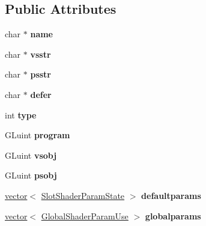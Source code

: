\subsection*{Public Attributes}
\begin{DoxyCompactItemize}
\item 
\mbox{\label{struct_shader_a63fc645b9235c69c54c1a5b6a019db69}} 
char $\ast$ {\bfseries name}
\item 
\mbox{\label{struct_shader_a8f583686f63b84538a737beba119cd3f}} 
char $\ast$ {\bfseries vsstr}
\item 
\mbox{\label{struct_shader_a3e5a80ad5f85e89ac4c89422ce9e760a}} 
char $\ast$ {\bfseries psstr}
\item 
\mbox{\label{struct_shader_aa9a61ea24ee4acdeb925b68b344c45d6}} 
char $\ast$ {\bfseries defer}
\item 
\mbox{\label{struct_shader_a24cd869ce48a60b5a3d3858f50b3f059}} 
int {\bfseries type}
\item 
\mbox{\label{struct_shader_af036f983d35fe0f8f31dedc009b3645e}} 
G\+Luint {\bfseries program}
\item 
\mbox{\label{struct_shader_a568390c78ee4b602db6628ddac38b637}} 
G\+Luint {\bfseries vsobj}
\item 
\mbox{\label{struct_shader_a5e44b9f57fec0dd35ad8ab08b0248491}} 
G\+Luint {\bfseries psobj}
\item 
\mbox{\label{struct_shader_a82b43cd598322ec53103dd4ec26a6782}} 
\hyperlink{structvector}{vector}$<$ \hyperlink{struct_slot_shader_param_state}{Slot\+Shader\+Param\+State} $>$ {\bfseries defaultparams}
\item 
\mbox{\label{struct_shader_a09b94beed7c8266c61543d69d8f7119d}} 
\hyperlink{structvector}{vector}$<$ \hyperlink{struct_global_shader_param_use}{Global\+Shader\+Param\+Use} $>$ {\bfseries globalparams}
\item 
\mbox{\label{struct_shader_affed7c9584ca8217ac3f21127f72977e}} 

\end{DoxyCompactItemize}
